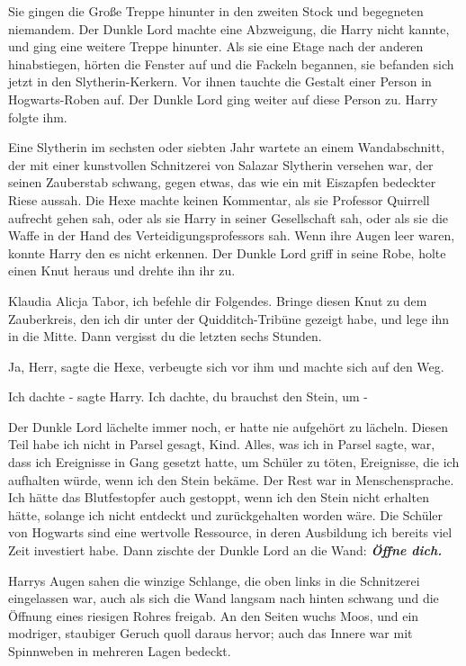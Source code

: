 Sie gingen die Große Treppe hinunter in den zweiten Stock und begegneten
niemandem. Der Dunkle Lord machte eine Abzweigung, die Harry nicht kannte, und
ging eine weitere Treppe hinunter. Als sie eine Etage nach der anderen
hinabstiegen, hörten die Fenster auf und die Fackeln begannen, sie befanden sich
jetzt in den Slytherin-Kerkern. Vor ihnen tauchte die Gestalt einer Person in
Hogwarts-Roben auf. Der Dunkle Lord ging weiter auf diese Person zu. Harry
folgte ihm.

Eine Slytherin im sechsten oder siebten Jahr wartete an einem Wandabschnitt, der
mit einer kunstvollen Schnitzerei von Salazar Slytherin versehen war, der seinen
Zauberstab schwang, gegen etwas, das wie ein mit Eiszapfen bedeckter Riese
aussah. Die Hexe machte keinen Kommentar, als sie Professor Quirrell aufrecht
gehen sah, oder als sie Harry in seiner Gesellschaft sah, oder als sie die Waffe
in der Hand des Verteidigungsprofessors sah. Wenn ihre Augen leer waren, konnte
Harry den es nicht erkennen. Der Dunkle Lord griff in seine Robe, holte einen
Knut heraus und drehte ihn ihr zu.

\glqq{}Klaudia Alicja Tabor, ich befehle dir Folgendes. Bringe diesen Knut zu dem
Zauberkreis, den ich dir unter der Quidditch-Tribüne gezeigt habe, und lege ihn
in die Mitte. Dann vergisst du die letzten sechs Stunden.\grqq{}

\glqq{}Ja, Herr\grqq{}, sagte die Hexe, verbeugte sich vor ihm und machte sich
auf den Weg.

\glqq{}Ich dachte -\grqq{} sagte Harry. \glqq{}Ich dachte, du brauchst den Stein,
um -\grqq{}

Der Dunkle Lord lächelte immer noch, er hatte nie aufgehört zu lächeln. \glqq{}
Diesen Teil habe ich nicht in Parsel gesagt, Kind. Alles, was ich in Parsel
sagte, war, dass ich Ereignisse in Gang gesetzt hatte, um Schüler zu töten,
Ereignisse, die ich aufhalten würde, wenn ich den Stein bekäme. Der Rest war in
Menschensprache. Ich hätte das Blutfestopfer auch gestoppt, wenn ich den Stein
nicht erhalten hätte, solange ich nicht entdeckt und zurückgehalten worden wäre.
Die Schüler von Hogwarts sind eine wertvolle Ressource, in deren Ausbildung ich
bereits viel Zeit investiert habe.\grqq{} Dann zischte der Dunkle Lord an die Wand:
\glqq{}\textbf{\emph{Öffne dich.}}\grqq{}

Harrys Augen sahen die winzige Schlange, die oben links in die Schnitzerei
eingelassen war, auch als sich die Wand langsam nach hinten schwang und die
Öffnung eines riesigen Rohres freigab. An den Seiten wuchs Moos, und ein
modriger, staubiger Geruch quoll daraus hervor; auch das Innere war mit
Spinnweben in mehreren Lagen bedeckt.

